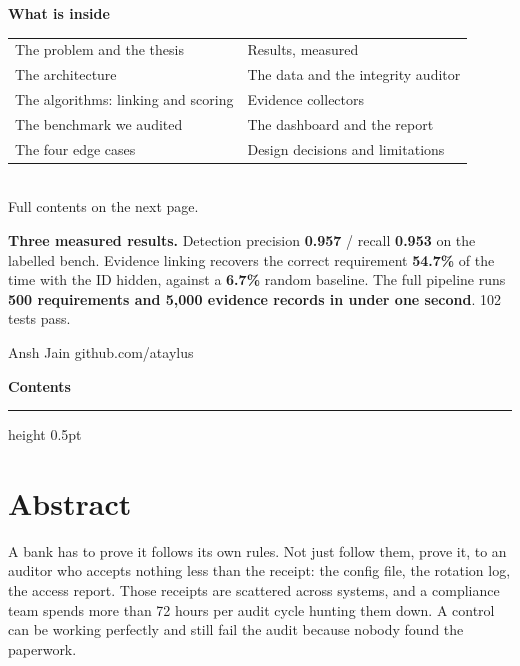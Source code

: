 \documentclass[11pt]{article}
\newcommand{\authorname}{Ansh Jain}
\newcommand{\authorhandle}{github.com/ataylus}
\newcommand{\watermark}{\authorname\,\textbar\,\authorhandle}
\begin{document}
\begin{titlepage}
{\sffamily\bfseries\color{navy}What is inside}\\[0.4em]
\begin{tabular}{@{}p{7.6cm}p{7.6cm}@{}}
\small The problem and the thesis & \small Results, measured \\
\small The architecture & \small The data and the integrity auditor \\
\small The algorithms: linking and scoring & \small Evidence collectors \\
\small The benchmark we audited & \small The dashboard and the report \\
\small The four edge cases & \small Design decisions and limitations \\
\end{tabular}\\[0.2em]
{\small\color{muted}Full contents on the next page.}

\vfill

\begin{resultbox}
\sffamily\small\color{ink}
\textbf{\color{navy}Three measured results.}
Detection precision \textbf{0.957} / recall \textbf{0.953} on the labelled bench.
Evidence linking recovers the correct requirement \textbf{54.7\%} of the time with the
ID hidden, against a \textbf{6.7\%} random baseline. The full pipeline runs
\textbf{500 requirements and 5,000 evidence records in under one second}. 102 tests pass.
\end{resultbox}

\vspace{0.3cm}
{\sffamily\footnotesize\color{muted}\watermark}
\end{titlepage}

\newpage
{\sffamily\bfseries\large\color{navy}Contents}
\vspace{0.4em}
{\color{line}\hrule height 0.5pt}
\vspace{0.6em}
\setcounter{tocdepth}{2}
\renewcommand{\contentsname}{\vspace{-2.2em}}
\tableofcontents

\newpage
\section{Abstract}

A bank has to prove it follows its own rules. Not just follow them, prove it, to an
auditor who accepts nothing less than the receipt: the config file, the rotation log,
the access report. Those receipts are scattered across systems, and a compliance team
spends more than 72 hours per audit cycle hunting them down. A control can be working perfectly and
still fail the audit because nobody found the paperwork.
\end{document}
